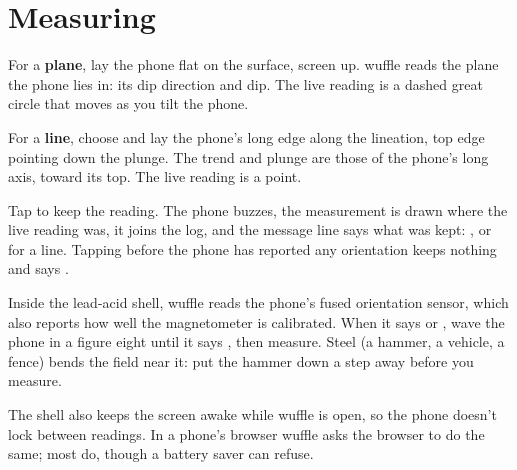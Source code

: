 
\section{Measuring}\label{sec:measuring}


For a \textbf{plane}, lay the phone flat on the surface, screen up. wuffle reads the plane the phone lies
in: its dip direction and dip. The live reading is a dashed great circle that moves as you tilt the phone.

For a \textbf{line}, choose  and lay the phone's long edge along the lineation, top edge pointing
down the plunge. The trend and plunge are those of the phone's long axis, toward its top. The live reading
is a point.


Tap  to keep the reading. The phone buzzes, the measurement is drawn where the live reading was, it
joins the log, and the message line says what was kept: , or  for a line. Tapping  before the phone has reported any orientation keeps nothing and says
.

\begin{tip}
Inside the lead-acid shell, wuffle reads the phone's fused orientation sensor, which also reports how
well the magnetometer is calibrated. When it says  or , wave the phone in a
figure eight until it says , then measure. Steel (a hammer, a vehicle, a fence) bends
the field near it: put the hammer down a step away before you measure.
\end{tip}

The shell also keeps the screen awake while wuffle is open, so the phone doesn't lock between readings.
In a phone's browser wuffle asks the browser to do the same; most do, though a battery saver can refuse.

